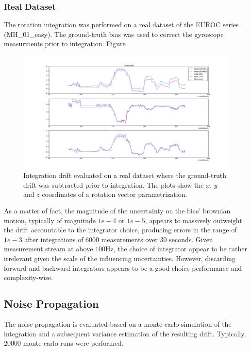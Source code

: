 \documentclass[10pt,a4paper]{article}
\numberwithin{equation}{section}
\begin{document}
\subsubsection{Real Dataset}

The rotation integration was performed on a real dataset of the EUROC series (MH\_01\_easy).
The ground-truth bias was used to correct the gyroscope measurments prior to integration. Figure \

\begin{figure}
\includegraphics[width=14cm]{figures/rotation_drift_real.pdf}
\caption{Integration drift evaluated on a real dataset where the ground-truth drift was subtracted prior to integration. The plots show the $x$, $y$ and $z$ coordinates of a rotation vector parametrization.}
\label{fig:rotation_drift_real}
\end{figure}	

As a matter of fact, the magnitude of the uncertainty on the bias' brownian motion, typically of magnitude $1e-4$ or $1e-5$, appears to massively outweight the drift accountable to the integrator choice, producing errors in the range of $1e-3$ after integrations of $6000$ measurements over $30$ seconds.
Given measurement stream at above $100$Hz, the choice of integrator appear to be rather irrelevant given the scale of the influencing uncertainties.
However, discarding forward and backward integrators appears to be a good choice performance and complexity-wise.

\subsection{Noise Propagation}
The noise propagation is evaluated based on a monte-carlo simulation of the integration and a subsequent variance estimation of the resulting drift. Typically, $20 000$ monte-carlo runs were performed.
\end{document}
